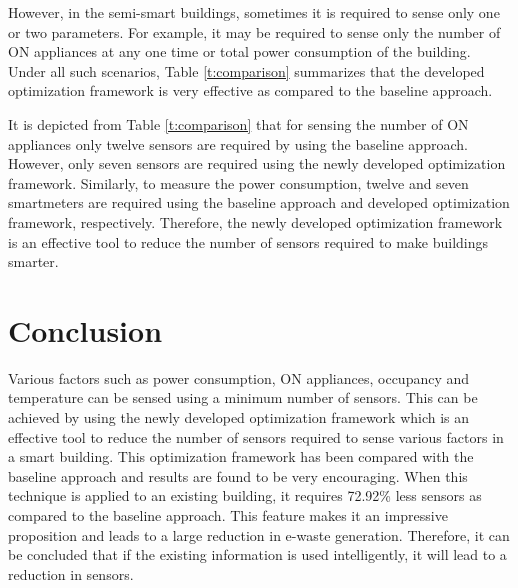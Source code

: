 \documentclass[]{interact}
\theoremstyle{plain}%
\theoremstyle{definition}
\theoremstyle{remark}
\begin{document}
However, in the semi-smart buildings, sometimes it is required to sense only one or two parameters. For example, it may be required to sense only the number of ON appliances at any one time or total power consumption of the building. Under all such scenarios, Table \ref{t:comparison} summarizes that the developed optimization framework is very effective as compared to the baseline approach.

It is depicted from Table \ref{t:comparison} that for sensing the number of ON appliances only twelve sensors are required by using the baseline approach. However, only seven sensors are required using the newly developed optimization framework. Similarly, to measure the power consumption, twelve and seven smartmeters are required using the baseline approach and developed optimization framework, respectively. Therefore, the newly developed optimization framework is an effective tool to reduce the number of sensors required to make buildings smarter.

\section{Conclusion}

Various factors such as power consumption, ON appliances, occupancy and temperature can be sensed using a minimum number of sensors.  This can be achieved by using the newly developed optimization framework which is an effective tool to reduce the number of sensors required to sense various factors in a smart building. This optimization framework has been compared with the baseline approach and results are found to be very encouraging. When this technique is applied to an existing building, it requires 72.92\% less sensors as compared to the baseline approach. This feature makes it an impressive proposition and leads to a large reduction in e-waste generation. Therefore, it can be concluded that if the existing information is used intelligently, it will lead to a reduction in sensors. 


\end{document}
